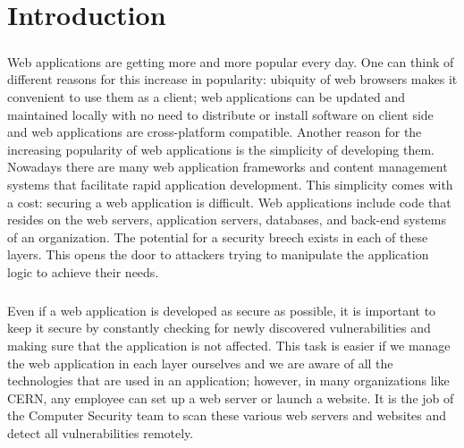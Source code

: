 \chapter{Introduction}
\label{introduction}
\thispagestyle{empty}
\paragraph{}
Web applications are getting more and more popular every day. One can think of different reasons for this increase in popularity: ubiquity of web browsers makes it convenient to use them as a client; web applications can be updated and maintained locally with no need to distribute or install software on client side and web applications are cross-platform compatible.
Another reason for the increasing popularity of web applications is the simplicity of developing them. Nowadays there are many web application frameworks and content management systems that facilitate rapid application development. This simplicity comes with a cost: securing a web application is difficult. Web applications include code that resides on the web servers, application servers, databases, and back-end systems of an organization. The potential for a security breech exists in each of these layers. This opens the door to attackers trying to manipulate the application logic to achieve their needs\cite{secure_web}.
\paragraph{}
Even if a web application is developed as secure as possible, it is important to keep it secure by constantly checking for newly discovered vulnerabilities and making sure that the application is not affected. This task is easier if we manage the web application in each layer ourselves and we are aware of all the technologies that are used in an application; however, in many organizations like CERN, any employee can set up a web server or launch a website. It is the job of the Computer Security team to scan these various web servers and websites and detect all vulnerabilities remotely.
